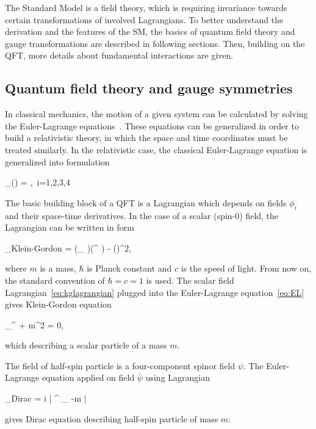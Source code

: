 The Standard Model is a field theory, which is requiring invariance towards certain transformations of involved Lagrangians. To better understand the derivation and the features of the SM, the basics of quantum field theory and gauge transformations are described in following sections. Then, building on the QFT, more details about fundamental interactions are given.

\subsection{Quantum field theory and gauge symmetries}

In classical mechanics, the motion of a given system can be calculated by solving the Euler-Lagrange equations~\cite{9783527411887}. These equations can be generalized in order to build a relativistic theory, in which the space and time coordinates must be treated similarly. In the relativistic case, the classical Euler-Lagrange equation is generalized into formulation

{
 \partial_{\mu}() = ,~i=1,2,3,4
}


The basic building block of a QFT is a Lagrangian which depends on fields $\phi_{i}$ and  their space-time derivatives. In the case of a scalar (spin-0) field, the Lagrangian can be written in form 

{
 _{Klein-Gordon} = (\partial_{\mu} \phi)(\partial^{\mu} \phi) -  ()^{2},
}

where $m$ is a mass, $\hbar$ is Planck constant and $c$ is the speed of light. From now on, the standard convention of $\hbar = c = 1$ is used. The scalar field Lagrangian~\ref{eq:kglagrangian} plugged into the Euler-Lagrange equation~\ref{eq:EL} gives Klein-Gordon equation

{
 \partial_{\mu}\partial^{\mu} \phi + m^{2} \phi = 0,
}

which describing a scalar particle of a mass $m$. 

The field of half-spin particle is a four-component spinor field $\psi$. The Euler-Lagrange equation applied on field $\bar{\psi}$ using Lagrangian


{
 _{Dirac} = i \bar{\psi} \gamma^{\mu} \partial_{\mu} \psi -m \bar{\psi} \psi
}

gives Dirac equation describing half-spin particle of mass $m$:

